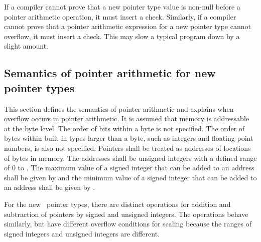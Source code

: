 If a compiler cannot prove that a new pointer type value is non-null
before a pointer arithmetic operation, it must insert a check.
Similarly, if a compiler cannot prove that a pointer arithmetic
expression for a new pointer type cannot overflow, it must insert a
check. This may slow a typical program down by a slight amount.

\subsection{Semantics of pointer arithmetic for new pointer types}
\label{section:new-pointer-types-semantics}

This section defines the semantics of pointer arithmetic and explains
when overflow occurs in pointer arithmetic. It is assumed that memory is
addressable at the byte level. The order of bits within a byte is not
specified. The order of bytes within built-in types larger than a byte,
such as integers and floating-point numbers, is also not specified.
Pointers shall be treated as addresses of locations of bytes in memory.
The addresses shall be unsigned integers with a defined range of 0 to
. The maximum value of a signed integer that can be
added to an address shall be given by  and the
minimum value of a signed integer that can be added to an address shall
be given by .

For the new
\arrayptrT\ pointer
types, there are distinct operations for addition and subtraction of
pointers by signed and unsigned integers. The operations behave
similarly, but have different overflow conditions for scaling because
the ranges of signed integers and unsigned integers are different.

